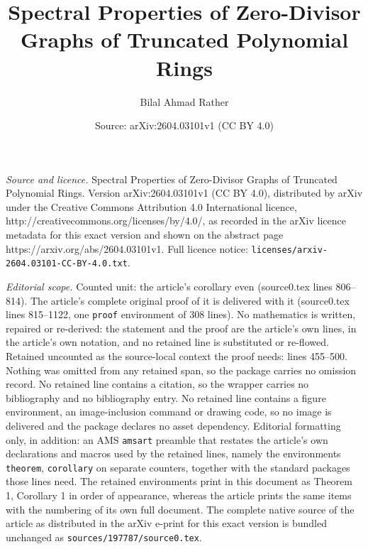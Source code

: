 \documentclass[10pt,a4paper]{amsart}
\title{Spectral Properties of Zero-Divisor Graphs of Truncated Polynomial Rings}
\author{Bilal Ahmad Rather}
\date{Source: arXiv:2604.03101v1 (CC BY 4.0)}
\begin{document}
\maketitle

\noindent\emph{Source and licence.} Spectral Properties of Zero-Divisor Graphs of Truncated Polynomial Rings. Version arXiv:2604.03101v1 (CC BY 4.0), distributed by arXiv under the Creative Commons Attribution 4.0 International licence, http://creativecommons.org/licenses/by/4.0/, as recorded in the arXiv licence metadata for this exact version and shown on the abstract page https://arxiv.org/abs/2604.03101v1. Full licence notice: \texttt{licenses/arxiv-2604.03101-CC-BY-4.0.txt}.\par\smallskip

\noindent\textit{Editorial scope.} Counted unit: the article's corollary even (source0.tex lines 806--814). The article's complete original proof of it is delivered with it (source0.tex lines 815--1122, one \texttt{proof} environment of 308 lines). No mathematics is written, repaired or re-derived: the statement and the proof are the article's own lines, in the article's own notation, and no retained line is substituted or re-flowed.  Retained uncounted as the source-local context the proof needs: lines 455--500.  Nothing was omitted from any retained span, so the package carries no omission record.  No retained line contains a citation, so the wrapper carries no bibliography and no bibliography entry.  No retained line contains a figure environment, an image-inclusion command or drawing code, so no image is delivered and the package declares no asset dependency.  Editorial formatting only, in addition: an AMS \texttt{amsart} preamble that restates the article's own declarations and macros used by the retained lines, namely the environments \texttt{theorem}, \texttt{corollary} on separate counters, together with the standard packages those lines need.  The retained environments print in this document as Theorem 1, Corollary 1 in order of appearance, whereas the article prints the same items with the numbering of its own full document.  The complete native source of the article as distributed in the arXiv e-print for this exact version is bundled unchanged as \texttt{sources/197787/source0.tex}.
\end{document}
